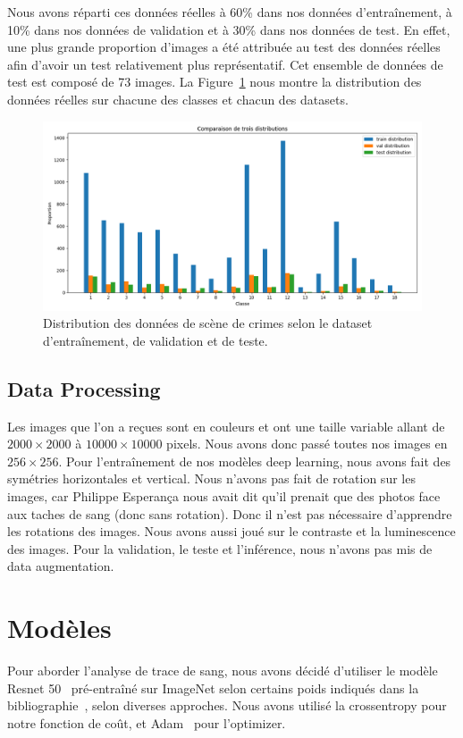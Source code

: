 \documentclass[a4paper]{article}
\begin{document}
Nous avons réparti ces données réelles à 60\% dans nos données d'entraînement, à 10\% dans nos données de validation et à 30\% dans nos données de test. En effet, une plus grande proportion d'images a été attribuée au test des données réelles afin d'avoir un test relativement plus représentatif. Cet ensemble de données de test est composé de 73 images. La Figure~\ref{fig:distribution real} nous montre la distribution des données réelles sur chacune des classes et chacun des datasets.

\begin{figure}[ht]
    \centering
    \includegraphics[width=0.8\linewidth]{../asset/distribution_train_val_test.png}
    \caption{Distribution des données de scène de crimes selon le dataset d'entraînement, de validation et de teste.}
    \label{fig:distribution real}
\end{figure}

\subsection{Data Processing}
Les images que l'on a reçues sont en couleurs et ont une taille variable allant de $2000\times2000$ à $10000\times10000$ pixels. Nous avons donc passé toutes nos images en $256\times256$. Pour l'entraînement de nos modèles deep learning, nous avons fait des symétries horizontales et vertical. Nous n'avons pas fait de rotation sur les images, car Philippe Esperança nous avait dit qu'il prenait que des photos face aux taches de sang (donc sans rotation). Donc il n'est pas nécessaire d'apprendre les rotations des images. Nous avons aussi joué sur le contraste et la luminescence des images. Pour la validation, le teste et l'inférence, nous n'avons pas mis de data augmentation.

\section{Modèles}

Pour aborder l'analyse de trace de sang, nous avons décidé d'utiliser le modèle Resnet 50~\cite{ResNet} pré-entraîné sur ImageNet selon certains poids indiqués dans la bibliographie~\cite{torchvision}, selon diverses approches. Nous avons utilisé la crossentropy pour notre fonction de coût, et Adam~\cite{adam} pour l'optimizer.
\end{document}
